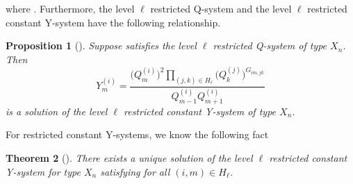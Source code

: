\documentclass[pdftex]{sigma}
\numberwithin{equation}{section}
\newtheorem{Theorem}{Theorem}[section]
\newtheorem{Proposition}[Theorem]{Proposition}
\newcommand{\R}{{\mathbb R}}
\begin{document}
where .
Furthermore, the level $\ell$ restricted Q-system and the level $\ell$ restricted constant Y-system have the following relationship.
	\begin{Proposition}[{\cite[Proposition 14.1]{KNS}}]\label{QY}
	Suppose  satisfies the level $\ell$ restricted Q-system of type $X_n$.
	Then
		\[Y_m^{(i)}=\frac{\bigl(Q_m^{(i)}\bigr)^2\prod_{(j,k)\in H_\ell}\bigl(Q_k^{(j)}\bigr)^{G_{im,jk}}}{Q_{m-1}^{(i)}Q_{m+1}^{(i)}}\]
	is a solution of the level $\ell$ restricted constant Y-system of type $X_n$.
	\end{Proposition}
For restricted constant Y-systems, we know the following fact
	\begin{Theorem}[{\cite{IIKKN, IIKKN2, KN}}]\label{Ysol}
	There exists a unique solution of the level $\ell$ restricted constant Y-system for type $X_n$ satisfying \smash{$Y_m^{(i)}\in\R_{\geq0}$} for all $(i,m)\in H_\ell$.
	\end{Theorem}
	
\end{document}
